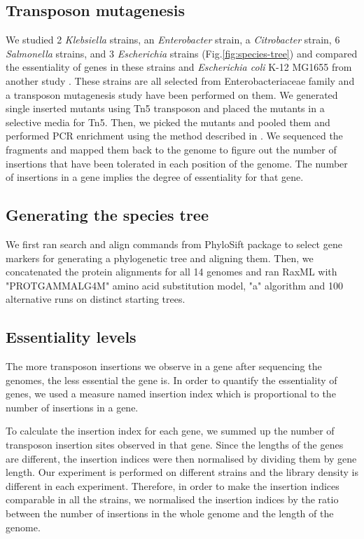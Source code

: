 \documentclass[12pt,letterpaper]{article}
\begin{document}
\subsection{Transposon mutagenesis}\label{sec:transposoninsertion}
We studied 2 \textit{Klebsiella} strains, an \textit{Enterobacter} strain, a \textit{Citrobacter} strain, 6 \textit{Salmonella} strains, and 3 \textit{Escherichia} strains (Fig.\@ \ref{fig:species-tree}) and compared the essentiality of genes in these strains and \textit{Escherichia coli} K-12 MG1655 from another study \cite{baba_construction_2006}. These strains are all selected from Enterobacteriaceae family and a transposon mutagenesis study have been performed on them. We generated single inserted mutants using Tn5 transposon and placed the mutants in a selective media for Tn5. Then, we picked the mutants and pooled them and performed PCR enrichment using the method described in \cite{barquist_tradis_2016}. We sequenced the fragments and mapped them back to the genome to figure out the number of insertions that have been tolerated in each position of the genome. The number of insertions in a gene implies the degree of essentiality for that gene.

\subsection{Generating the species tree}\label{sec:phylogenetic}
We first ran search and align commands from PhyloSift package \cite{darling_phylosift:_2014} to select gene markers for generating a phylogenetic tree and aligning them. Then, we concatenated the protein alignments for all 14 genomes and ran RaxML \cite{stamatakis_raxml_2014} with "PROTGAMMALG4M" amino acid substitution model, "a" algorithm and 100 alternative runs on distinct starting trees.

\subsection{Essentiality levels}\label{sec:essentiality}
The more transposon insertions we observe in a gene after sequencing the genomes, the less essential the gene is. In order to quantify the essentiality of genes, we used a measure named insertion index which is proportional to the number of insertions in a gene.

To calculate the insertion index for each gene, we summed up the number of transposon insertion sites observed in that gene. Since the lengths of the genes are different, the insertion indices were then normalised by dividing them by gene length. Our experiment is performed on different strains and the library density is different in each experiment. Therefore, in order to make the insertion indices comparable in all the strains, we normalised the insertion indices by the ratio between the number of insertions in the whole genome and the length of the genome.
\end{document}
